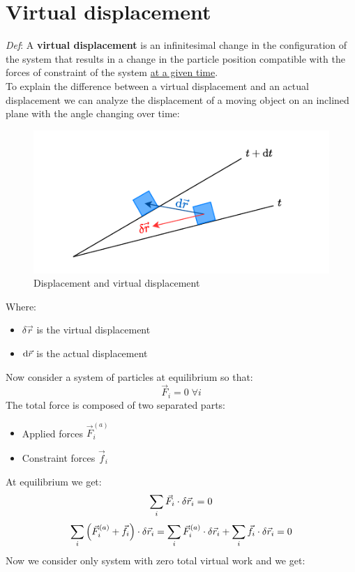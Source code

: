 \section{Virtual displacement}
\textit{Def}: A \textbf{virtual displacement} is an infinitesimal change in the configuration of the system that results in a change in the particle position compatible with the forces of constraint of the system \underline{at a given time}.\\
To explain the difference between a virtual displacement and an actual displacement we can analyze the displacement of a moving object on an inclined plane with the angle changing over time:
\begin{figure}[!ht]
  \centering
  \includegraphics[width=0.5\linewidth]{res/svg/virtualdisplacement.drawio}
  \caption{Displacement and virtual displacement}
  \label{fig:image8}
\end{figure}
Where:
\begin{itemize}
    \item $\delta \vec{r}$ is the virtual displacement
    \item $\mathrm{d}\vec{r}$ is the actual displacement
\end{itemize}
Now consider a system of particles at equilibrium so that:
\begin{equation}
    \vec{F}_i = 0\;\forall i
\end{equation}
The total force is composed of two separated parts:
\begin{itemize}
    \item Applied forces $\vec{F}^{(a)}_i$
    \item Constraint forces $\vec{f}_i$
\end{itemize}
At equilibrium we get:
\begin{equation}
    \displaystyle\sum_i \vec{F}_i \cdot \delta \vec{r}_i = 0
\end{equation}
\begin{equation}
    \displaystyle\sum_i \left(\vec{F}^{(a)}_i + \vec{f}_i\right) \cdot \delta \vec{r}_i = \displaystyle\sum_i \vec{F}^{(a)}_i \cdot \delta \vec{r}_i + \displaystyle\sum_i \vec{f}_i \cdot \delta \vec{r}_i = 0
\end{equation}
Now we consider only system with zero total virtual work and we get:
